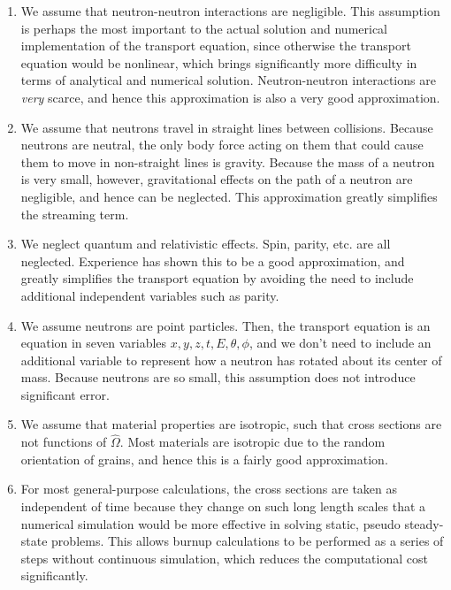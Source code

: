 \documentclass[10pt]{article}
\newcommand*\circled[1]{\tikz[baseline=(char.base)]{
            \node[shape=circle,draw,inner sep=2pt] (char) {#1};}}
\begin{document}
\begin{enumerate}
\item We assume that neutron-neutron interactions are negligible. This assumption is perhaps the most important to the actual solution and numerical implementation of the transport equation, since otherwise the transport equation would be nonlinear, which brings significantly more difficulty in terms of analytical and numerical solution. Neutron-neutron interactions are \textit{very} scarce, and hence this approximation is also a very good approximation.
\item We assume that neutrons travel in straight lines between collisions. Because neutrons are neutral, the only body force acting on them that could cause them to move in non-straight lines is gravity. Because the mass of a neutron is very small, however, gravitational effects on the path of a neutron are negligible, and hence can be neglected. This approximation greatly simplifies the streaming term.
\item We neglect quantum and relativistic effects. Spin, parity, etc. are all neglected. Experience has shown this to be a good approximation, and greatly simplifies the transport equation by avoiding the need to include additional independent variables such as parity.
\item We assume neutrons are point particles. Then, the transport equation is an equation in seven variables \(x, y, z, t, E, \theta, \phi\), and we don't need to include an additional variable to represent how a neutron has rotated about its center of mass. Because neutrons are so small, this assumption does not introduce significant error.
\item We assume that material properties are isotropic, such that cross sections are not functions of \(\hat{\Omega}\). Most materials are isotropic due to the random orientation of grains, and hence this is a fairly good approximation.
\item For most general-purpose calculations, the cross sections are taken as independent of time because they change on such long length scales that a numerical simulation would be more effective in solving static, pseudo steady-state problems. This allows burnup calculations to be performed as a series of steps without continuous simulation, which reduces the computational cost significantly.
\end{enumerate}

\circled{8}\newline
\end{document}
